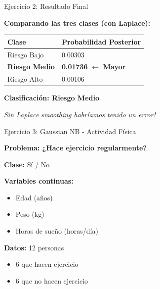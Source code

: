 \documentclass{beamer}
\begin{document}
\begin{frame}{Ejercicio 2: Resultado Final}
    \begin{center}
        \textbf{Comparando las tres clases (con Laplace):}

        \vspace{0.8cm}

        \begin{tabular}{ll}
            \toprule
            \textbf{Clase} & \textbf{Probabilidad Posterior} \\
            \midrule
            Riesgo Bajo & 0.00303 \\
            \textcolor{primary}{\textbf{Riesgo Medio}} & \textcolor{primary}{\textbf{0.01736}} $\leftarrow$ \textbf{Mayor} \\
            Riesgo Alto & 0.00106 \\
            \bottomrule
        \end{tabular}

        \vspace{0.8cm}

        \Large{\textbf{Clasificación: Riesgo Medio}}

        \vspace{0.5cm}

        \normalsize{\textit{Sin Laplace smoothing habríamos tenido un error!}}
    \end{center}
\end{frame}

\begin{frame}{Ejercicio 3: Gaussian NB - Actividad Física}
    \begin{center}
        \textbf{Problema: ¿Hace ejercicio regularmente?}

        \vspace{0.3cm}

        \textbf{Clase:} Sí / No
    \end{center}

    \textbf{Variables continuas:}
    \begin{itemize}
        \item Edad (años)
        \item Peso (kg)
        \item Horas de sueño (horas/día)
    \end{itemize}

    \textbf{Datos:} 12 personas
    \begin{itemize}
        \item 6 que hacen ejercicio
        \item 6 que no hacen ejercicio
    \end{itemize}
\end{frame}
\end{document}
